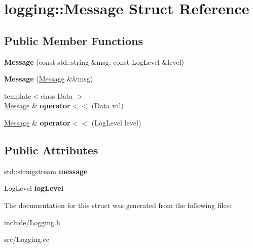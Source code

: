 \hypertarget{structlogging_1_1Message}{}\section{logging\+:\+:Message Struct Reference}
\label{structlogging_1_1Message}
\subsection*{Public Member Functions}
\begin{DoxyCompactItemize}
\item 
{\bfseries Message} (const std\+::string \&msg, const Log\+Level \&level)\hypertarget{structlogging_1_1Message_a269f8a973fdb492d6ba0cb2a5220dc9a}{}\label{structlogging_1_1Message_a269f8a973fdb492d6ba0cb2a5220dc9a}

\item 
{\bfseries Message} (\hyperlink{structlogging_1_1Message}{Message} \&\&msg)\hypertarget{structlogging_1_1Message_ad83bdcff3b05fdad2f5cd4a2a63ef3e4}{}\label{structlogging_1_1Message_ad83bdcff3b05fdad2f5cd4a2a63ef3e4}

\item 
{\footnotesize template$<$class Data $>$ }\\\hyperlink{structlogging_1_1Message}{Message} \& {\bfseries operator$<$$<$} (Data val)\hypertarget{structlogging_1_1Message_aaf57fc11f46fae6b5db02d8b901eddbf}{}\label{structlogging_1_1Message_aaf57fc11f46fae6b5db02d8b901eddbf}

\item 
\hyperlink{structlogging_1_1Message}{Message} \& {\bfseries operator$<$$<$} (Log\+Level level)\hypertarget{structlogging_1_1Message_a9e1399e37cb967d57e693589c12e3245}{}\label{structlogging_1_1Message_a9e1399e37cb967d57e693589c12e3245}

\end{DoxyCompactItemize}
\subsection*{Public Attributes}
\begin{DoxyCompactItemize}
\item 
std\+::stringstream {\bfseries message}\hypertarget{structlogging_1_1Message_a6ca31494b2b054ac966a339bf64fcc53}{}\label{structlogging_1_1Message_a6ca31494b2b054ac966a339bf64fcc53}

\item 
Log\+Level {\bfseries log\+Level}\hypertarget{structlogging_1_1Message_a8f9018f8332f4c3f7831fd75b4326c1e}{}\label{structlogging_1_1Message_a8f9018f8332f4c3f7831fd75b4326c1e}

\end{DoxyCompactItemize}


The documentation for this struct was generated from the following files\+:\begin{DoxyCompactItemize}
\item 
include/Logging.\+h\item 
src/Logging.\+cc\end{DoxyCompactItemize}
